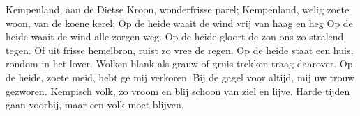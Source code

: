 \beginverse
Kempenland, aan de Dietse Kroon,
wonderfrisse parel;
Kempenland, welig zoete woon,
van de koene kerel;
\endverse
\beginchorus
Op de heide waait de wind
vrij van haag en heg
Op de heide waait de wind
alle zorgen weg.
\endchorus
\beginverse
Op de heide gloort de zon
ons zo stralend tegen.
Of uit frisse hemelbron,
ruist zo vree de regen.
\endverse
\beginverse
Op de heide staat een huis,
rondom in het lover.
Wolken blank als grauw of gruis
trekken traag daarover.
\endverse
\beginverse
Op de heide, zoete meid,
hebt ge mij verkoren.
Bij de gagel voor altijd,
mij uw trouw gezworen.
\endverse
\beginverse
Kempisch volk, zo vroom en blij
schoon van ziel en lijve.
Harde tijden gaan voorbij,
maar een volk moet blijven.
\endverse
\endsong